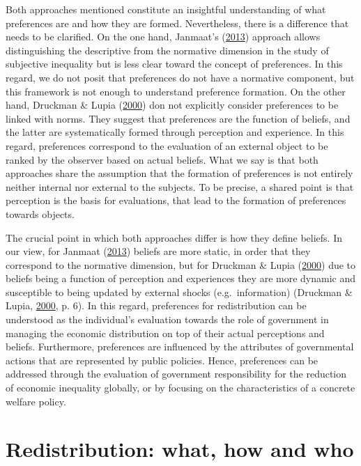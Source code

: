 \documentclass[
  12pt,
]{book}
\begin{document}
Both approaches mentioned constitute an insightful understanding of what preferences are and how they are formed. Nevertheless, there is a difference that needs to be clarified. On the one hand, Janmaat's (\protect\hyperlink{ref-Janmaat2013}{2013}) approach allows distinguishing the descriptive from the normative dimension in the study of subjective inequality but is less clear toward the concept of preferences. In this regard, we do not posit that preferences do not have a normative component, but this framework is not enough to understand preference formation. On the other hand, Druckman \& Lupia (\protect\hyperlink{ref-druckman_preference_2000}{2000}) don not explicitly consider preferences to be linked with norms. They suggest that preferences are the function of beliefs, and the latter are systematically formed through perception and experience. In this regard, preferences correspond to the evaluation of an external object to be ranked by the observer based on actual beliefs. What we say is that both approaches share the assumption that the formation of preferences is not entirely neither internal nor external to the subjects. To be precise, a shared point is that perception is the basis for evaluations, that lead to the formation of preferences towards objects.

The crucial point in which both approaches differ is how they define beliefs. In our view, for Janmaat (\protect\hyperlink{ref-Janmaat2013}{2013}) beliefs are more static, in order that they correspond to the normative dimension, but for Druckman \& Lupia (\protect\hyperlink{ref-druckman_preference_2000}{2000}) due to beliefs being a function of perception and experiences they are more dynamic and susceptible to being updated by external shocks (e.g.~information) (Druckman \& Lupia, \protect\hyperlink{ref-druckman_preference_2000}{2000}, p. 6). In this regard, preferences for redistribution can be understood as the individual's evaluation towards the role of government in managing the economic distribution on top of their actual perceptions and beliefs. Furthermore, preferences are influenced by the attributes of governmental actions that are represented by public policies. Hence, preferences can be addressed through the evaluation of government responsibility for the reduction of economic inequality globally, or by focusing on the characteristics of a concrete welfare policy.

\hypertarget{redistribution-what-how-and-who}{%
\section{Redistribution: what, how and who}\label{redistribution-what-how-and-who}}
\end{document}
